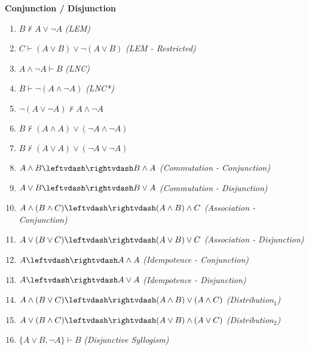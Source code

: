 
\noindent \textbf{Conjunction / Disjunction}

\begin{enumerate}
\setcounter{enumi}{\value{enumi_saved}}
\item $ B\nvdash  A \vee  \neg A $\hfill\emph{ (LEM)}  
\item $ C\vdash  (A \vee  B) \vee  \neg (A \vee  B) $\hfill\emph{ (LEM - Restricted)}  
\item $ A \wedge  \neg A\vdash  B $\hfill\emph{ (LNC)}  
\item $ B\vdash  \neg (A \wedge  \neg A) $\hfill\emph{ (LNC*)}  
\item $ \neg (A \vee  \neg A)\nvdash  A \wedge  \neg A $\hfill\emph{ }  
\item $ B\nvdash  (A \wedge  A) \vee  (\neg A \wedge  \neg A) $\hfill\emph{ }  
\item $ B\nvdash  (A \vee  A) \vee  (\neg A \vee  \neg A) $\hfill\emph{ }  
\item $ A \wedge  B\leftvdash\rightvdash  B \wedge  A $ \hfill\emph{ (Commutation - Conjunction)}  
\item $ A \vee  B\leftvdash\rightvdash  B \vee  A $ \hfill\emph{ (Commutation - Disjunction)}  
\item $ A \wedge  (B \wedge  C)\leftvdash\rightvdash  (A \wedge  B) \wedge  C $ \hfill\emph{ (Association - Conjunction)}  
\item $ A \vee  (B \vee  C)\leftvdash\rightvdash  (A \vee  B) \vee  C $ \hfill\emph{ (Association - Disjunction)}  
\item $ A\leftvdash\rightvdash  A \wedge  A $ \hfill\emph{ (Idempotence - Conjunction)}  
\item $ A\leftvdash\rightvdash  A \vee  A $ \hfill\emph{ (Idempotence - Disjunction)}  
\item $ A \wedge  (B \vee  C)\leftvdash\rightvdash  (A \wedge  B) \vee  (A \wedge  C) $ \hfill\emph{ (Distribution$_1$)}  
\item $ A \vee  (B \wedge  C)\leftvdash\rightvdash  (A \vee  B) \wedge  (A \vee  C) $ \hfill\emph{ (Distribution$_2$)}  
\item $ \{A \vee  B, \neg A \} \vdash  B $\hfill\emph{ (Disjunctive Syllogism)}  
\setcounter{enumi_saved}{\value{enumi}}
\end{enumerate}






